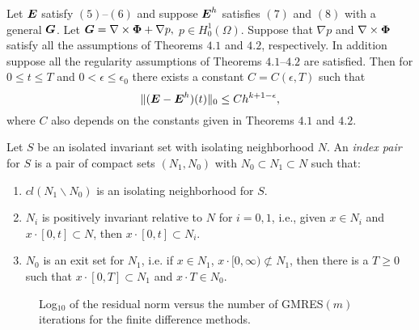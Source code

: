 \begin{corollary}\label{c4.1}
Let $ \mbox{\boldmath$E$} $ satisfy $(5)$--$(6)$ and
suppose $ \mbox{\boldmath$E$}^h $ satisfies $(7)$ and $(8)$
with a general $ \mbox{\boldmath$G$} $.  Let $ \mbox{\boldmath$G$}= \nabla \times {\bf \Phi} + \nabla p,$
$p \in H_0^1 (\Omega) $. Suppose that $\nabla p$ and $ \nabla \times 
{\bf \Phi} $ satisfy all the assumptions of Theorems $4.1$ and  
$4.2$, respectively. In addition suppose all the regularity
assumptions of Theorems $4.1$--$4.2$ are satisfied.  Then 
for $ 0 \le t \le T $ and $ 0 < \epsilon \le \epsilon_0 $ there exists a 
constant $ C = C(\epsilon, T) $ such that
$$
\Vert (\mbox{\boldmath$E$} - \mbox{\boldmath$E$}^h)(t) \Vert_0 \le C h^{k+1- \epsilon},
$$
where $ C $ also depends on the constants given in Theorems 
$4.1$ and $4.2$.
\end{corollary}


\begin{definition}
Let $S$ be an isolated invariant set with isolating neighborhood $N$.
An {\em index pair} for $S$ is a pair of compact sets $(N_{1},N_{0})$
with $N_{0} \subset N_{1} \subset N$ such that:
\begin{enumerate}
\item $cl(N_{1} \backslash N_{0})$
is an isolating neighborhood for $S$.
\item $N_{i}$ is positively invariant relative to $N$ for $i=0,1$,
i.e., given
$x \in N_{i}$ and $x \cdot [0,t] \subset N$, then $x \cdot [0,t] \subset
N_{i}$.
\item $N_{0}$ is an exit set for $N_{1}$, i.e. if $x \in N_{1}$,
$x \cdot [0, \infty ) \not\subset N_{1}$, then there is a $T \geq 0$ such
that $x \cdot [0,T] \subset N_{1}$ and $x \cdot T \in N_{0}$.
\end{enumerate}
\end{definition}


\begin{figure}
\caption{{\rm Log}$_{10}$ of the residual norm versus the number of
{\rm GMRES$(m)$} iterations for the finite difference methods.} 
\label{diff} 
\end{figure}


